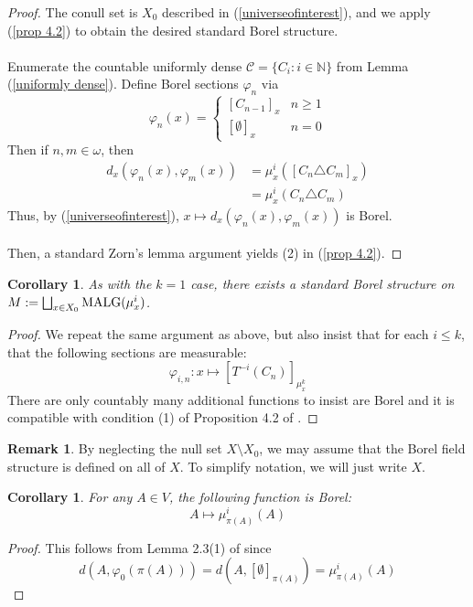 \documentclass{article}
\newcommand{\malg}[1]{\textmd{MALG}(#1)}
\let\oldref\ref
\renewcommand{\ref}[1]{(\oldref{#1})}
\newtheorem{corollary}[theorem]{Corollary}
\theoremstyle{definition}
\newtheorem{remark}[theorem]{Remark}
\begin{document}
\begin{proof}
    The conull set is $ X_0 $ described in \ref{universeofinterest}, and we apply \ref{prop 4.2} to obtain the desired standard Borel structure.\\\\
    Enumerate the countable uniformly dense $ \mathcal{C} = \{C_i:i\in \mathbb{N}\} $ from Lemma \ref{uniformly dense}. Define Borel sections $ \varphi_n $ via
    \[
    \varphi_n(x) = \begin{cases}
        [C_{n-1}]_x & n\geq 1\\
        [\emptyset]_x & n = 0
    \end{cases}
    \]
    Then if $ n,m\in \omega $, then
    \begin{align*}
        d_x(\varphi_n(x),\varphi_m(x)) &= \mu^i_x ([C_n\triangle C_m]_x)\\
        &= \mu^i_x(C_n\triangle C_m)
    \end{align*}
    Thus, by \ref{universeofinterest}, $ x\mapsto d_x(\varphi_n(x),\varphi_m(x)) $ is Borel.\\\\
    Then, a standard Zorn's lemma argument yields (2) in \ref{prop 4.2}.
\end{proof}
\begin{corollary}
    As with the $ k=1 $ case, there exists a standard Borel structure on $ M:=\bigsqcup_{x\in X_{0}} \malg{\mu^i_x} $.
\end{corollary}
\begin{proof}
    We repeat the same argument as above, but also insist that for each $ i\leq k $, that the following sections are measurable:
    \[
    \varphi_{i,n}:x\mapsto [T^{-i}(C_n)]_{\mu_x^k}
    \]
    There are only countably many additional functions to insist are Borel and it is compatible with condition (1) of Proposition 4.2 of \cite{borelfieldpaper}.
\end{proof}
\begin{remark}
    By neglecting the null set $X\setminus X_0 $, we may assume that the Borel field structure is defined on all of $ X $. To simplify notation, we will just write $ X $. 
\end{remark}
\begin{corollary}\label{cor1}
    For any $ A \in V $, the following function is Borel:
    \[
    A\mapsto \mu^i_{\pi(A)}(A)
    \]
\end{corollary}
\begin{proof}
    This follows from Lemma 2.3(1) of \cite{borelfieldpaper} since 
    \[
    d(A,\varphi_0(\pi(A))) = d(A,[\emptyset]_{\pi(A)}) = \mu^i_{\pi(A)}(A) 
    \]
\end{proof}
\end{document}
